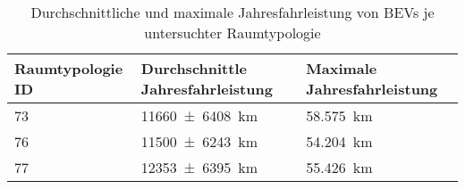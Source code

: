 {
\renewcommand{\arraystretch}{1.2}%
\begin{table}[H]
	\begin{center}
		\caption{Durchschnittliche und maximale Jahresfahrleistung von BEVs je untersuchter Raumtypologie}
		\begin{tabu} to \textwidth {X[1] X[1.5, r] X[1.5, r]}
			\hline
			Raumtypologie ID 	   & Durchschnittle Jahresfahrleistung                  & Maximale Jahresfahrleistung \\ \hline
			\num{73}               & \SI[separate-uncertainty = true]{11660(6408)}{\km} & \SI{58.575}{\km}            \\ \hline
			\num{76}               & \SI[separate-uncertainty = true]{11500(6243)}{\km} & \SI{54.204}{\km}            \\
			\num{77}               & \SI[separate-uncertainty = true]{12353(6395)}{\km} & \SI{55.426}{\km}            \\
		\end{tabu}
		\label{tab:bev_distance}
	\end{center}
	\vspace{-3mm}%
\end{table}
}